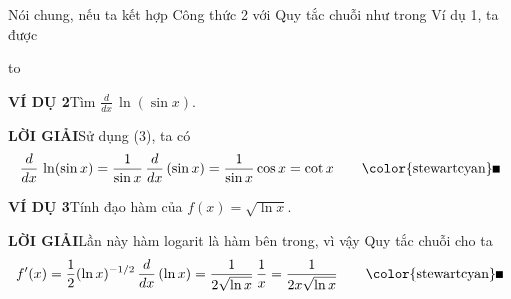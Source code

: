 \begin{minipage}[t]{0.75\textwidth}
  Nói chung, nếu ta kết hợp Công thức 2 với Quy tắc chuỗi như trong Ví dụ 1, ta được

  \vspace{0.4em}
  \noindent
  \hbox to 
  \vspace{0.6em}

  \noindent
  \textbf{\textsf{\color{stewartcyan}VÍ DỤ 2}}\quad Tìm $\displaystyle \frac{d}{dx}\,\ln(\sin x)$.

  \vspace{0.3em}
  \noindent
  \textbf{\textsf{\color{stewartcyan}LỜI GIẢI}}\quad Sử dụng (3), ta có
  \[
    \frac{d}{dx}\,\ln(\sin x) = \frac{1}{\sin x}\,\frac{d}{dx}\,(\sin x) = \frac{1}{\sin x}\cos x = \cot x \tag*{\color{stewartcyan}\rule{1.15ex}{1.15ex}}
  \]

  \vspace{0.4em}
  \noindent
  \textbf{\textsf{\color{stewartcyan}VÍ DỤ 3}}\quad Tính đạo hàm của $f(x) = \sqrt{\ln x}$.

  \vspace{0.3em}
  \noindent
  \textbf{\textsf{\color{stewartcyan}LỜI GIẢI}}\quad Lần này hàm logarit là hàm bên trong, vì vậy Quy tắc chuỗi cho ta
  \[
    f'(x) = \frac{1}{2}(\ln x)^{-1/2}\,\frac{d}{dx}\,(\ln x) = \frac{1}{2\sqrt{\ln x}}\,\frac{1}{x} = \frac{1}{2x\sqrt{\ln x}} \tag*{\color{stewartcyan}\rule{1.15ex}{1.15ex}}
  \]
\end{minipage}
